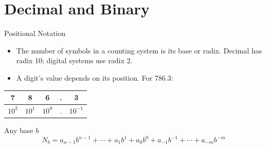 \documentclass[9pt,aspectratio=169,xcolor=table]{beamer}
\begin{document}
\section{Decimal and Binary}

\begin{frame}{Positional Notation}
  \begin{itemize}
    \item The number of symbols in a counting system is its \alert{base} or \alert{radix}. Decimal has radix 10; digital systems use radix 2.
    \item A digit's value depends on its \alert{position}. For 786.3:
  \end{itemize}
  \begin{center}
  \begin{tabular}{|c|c|c|c|c|}
    \hline
    7 & 8 & 6 & . & 3 \\ \hline
    $10^{2}$ & $10^{1}$ & $10^{0}$ & . & $10^{-1}$ \\ \hline
  \end{tabular}
  \end{center}
  \begin{block}{Any base $b$}
    \[ N_b = a_{n-1}b^{n-1} + \cdots + a_1 b^1 + a_0 b^0 + a_{-1}b^{-1} + \cdots + a_{-m}b^{-m} \]
  \end{block}
\end{frame}
\end{document}
